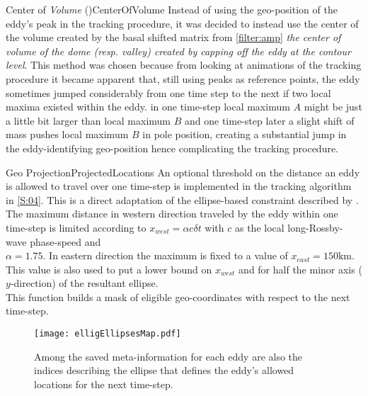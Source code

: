 \begin{filter}{Center of \textit{Volume} (\CoV)}{CenterOfVolume}
\label{filter:CoV}
Instead of using the geo-position of the eddy's peak in the tracking procedure,
it was decided to instead use the center of the volume created by the basal
shifted matrix from \cref{filter:amp} \ie \textit{the center of volume of the
dome
(resp. valley) created by capping off the eddy at the contour level}.
This method was chosen because from looking at animations of the tracking
procedure
it became apparent that, still using peaks as reference points, the eddy
sometimes jumped considerably from one time step to the next if two local maxima
existed within the eddy. \Eg in one time-step local maximum $A$ might be just a
little bit larger than local maximum $B$ and one time-step later a slight shift
of mass pushes local maximum $B$ in pole position, creating a substantial jump
in the eddy-identifying geo-position hence complicating the tracking procedure.
\end{filter}\newline
\begin{filter}{Geo Projection}{ProjectedLocations}
\label{filter:projLocs}
An optional threshold on the distance an eddy is allowed to travel over one time-step is implemented in the tracking algorithm in \cref{S:04}. This is a direct adaptation of the ellipse-based constraint described by \citet{Chelton2011}. The maximum distance in western direction traveled by the eddy within one time-step is limited according to $x_{west} = \alpha c \delta{t} $ with $c$ as the local long-Rossby-wave phase-speed and \\ \eg $\alpha=1.75$. In eastern direction the maximum is fixed to a value of \eg $x_{east} = 150\mathrm{km}$. This value is also used to put a lower bound on $x_{west}$ and for half the minor axis ($y$-direction) of the resultant ellipse.   \\
This function builds a mask of eligible geo-coordinates with respect to the next time-step.
\end{filter}\newline

\begin{figure}
		\texttt{[image: elligEllipsesMap.pdf]}
		\caption{Among the saved meta-information for each eddy are also the indices describing the ellipse that defines the eddy's allowed locations for the next time-step.}
		\label{fig:elligEllipse}
\end{figure}
